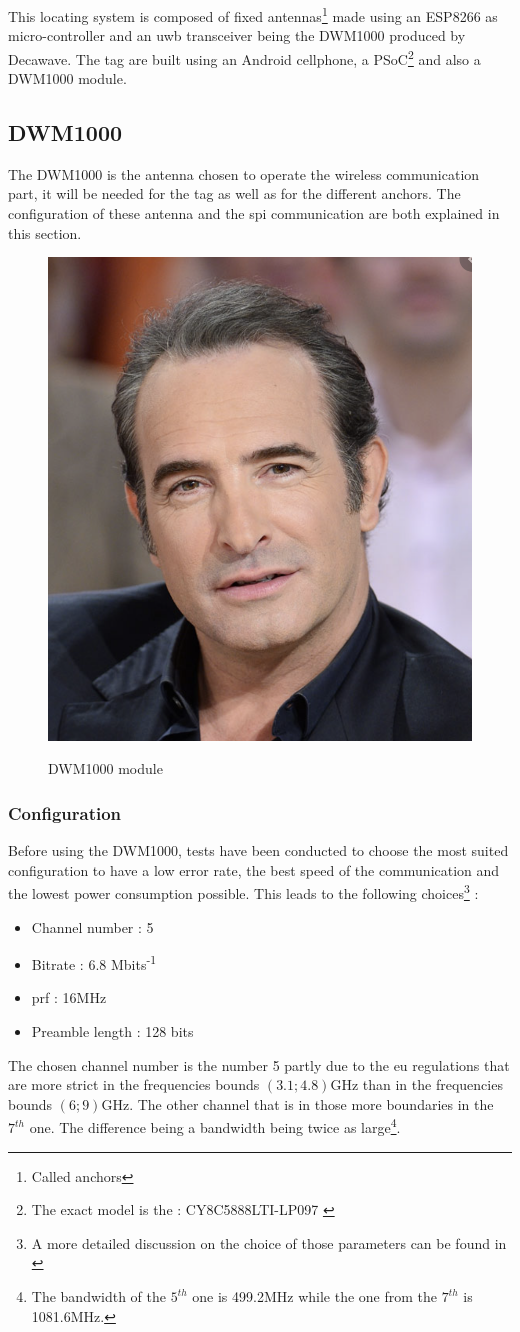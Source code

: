 This locating system is composed of fixed antennas\footnote{Called anchors} made using an ESP8266 as micro-controller and an \gls{uwb} transceiver being the DWM1000 produced by Decawave\cite{decawave}. The tag are built using an Android cellphone, a PSoC\footnote{The exact model is the : CY8C5888LTI-LP097 \cite{guyard2019navigation}} and also a DWM1000 module.

\subsection{DWM1000}

The DWM1000 is the antenna chosen to operate the wireless communication part, it will be needed for the tag as well as for the different anchors. The configuration of these antenna and the \gls{spi} communication are both explained in this section.

\begin{figure}[H]
	\centering
	\includegraphics[width=.2\linewidth]{Images/Temporary_pic.png}
	\label{fig:dwm1000}
	\caption{DWM1000 module}
\end{figure}

\subsubsection{Configuration}

Before using the DWM1000, tests have been conducted to choose the most suited configuration to have a low error rate, the  best speed of the communication and the lowest power consumption possible. This leads to the following choices\footnote{A more detailed discussion on the choice of those parameters can be found in \cite{hannotier2019indoor}} :

\begin{itemize}
\item Channel number : 5
\item Bitrate : 6.8 Mbits\textsuperscript{-1}
\item \gls{prf} : 16MHz
\item Preamble length : 128 bits
\end{itemize}

The chosen channel number is the number 5 partly due to the \gls{eu} regulations that are more strict in the frequencies bounds $(3.1; 4.8)$GHz than in the frequencies bounds $(6; 9)$GHz\cite{eulaw}. The other channel that is in those more  boundaries in the $7^{th}$ one. The difference being a bandwidth being twice as large\footnote{The bandwidth of the $5^{th}$ one is 499.2MHz while the one from the $7^{th}$ is 1081.6MHz.}. 
\vspace{2mm}

